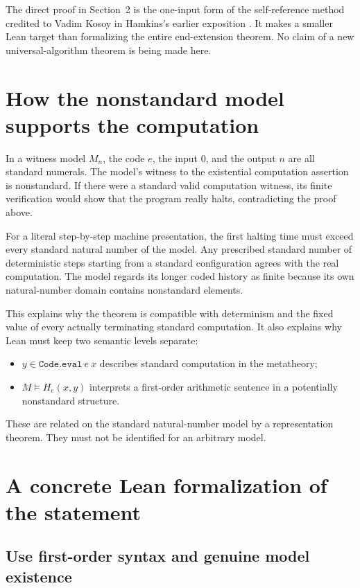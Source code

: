 \documentclass[11pt]{article}
\theoremstyle{definition}
\theoremstyle{remark}
\begin{document}
The direct proof in Section~2 is the one-input form of the self-reference
method credited to Vadim Kosoy in Hamkins's earlier exposition
\cite{Hamkins2016}. It makes a smaller Lean target than formalizing the
entire end-extension theorem. No claim of a new universal-algorithm
theorem is being made here.

\section{How the nonstandard model supports the computation}

In a witness model $M_n$, the code $e$, the input $0$, and the output $n$
are all standard numerals. The model's witness to the existential
computation assertion is nonstandard. If there were a standard valid
computation witness, its finite verification would show that the program
really halts, contradicting the proof above.

For a literal step-by-step machine presentation, the first halting time
must exceed every standard natural number of the model. Any prescribed
standard number of deterministic steps starting from a standard
configuration agrees with the real computation. The model regards its
longer coded history as finite because its own natural-number domain
contains nonstandard elements.

This explains why the theorem is compatible with determinism and the
fixed value of every actually terminating standard computation. It also
explains why Lean must keep two semantic levels separate:
\begin{itemize}
 \item $y\in\texttt{Code.eval}\ e\ x$ describes standard computation in
       the metatheory;
 \item $M\models H_e(x,y)$ interprets a first-order arithmetic sentence
       in a potentially nonstandard structure.
\end{itemize}
These are related on the standard natural-number model by a
representation theorem. They must not be identified for an arbitrary
model.

\section{A concrete Lean formalization of the statement}

\subsection{Use first-order syntax and genuine model existence}
\end{document}
